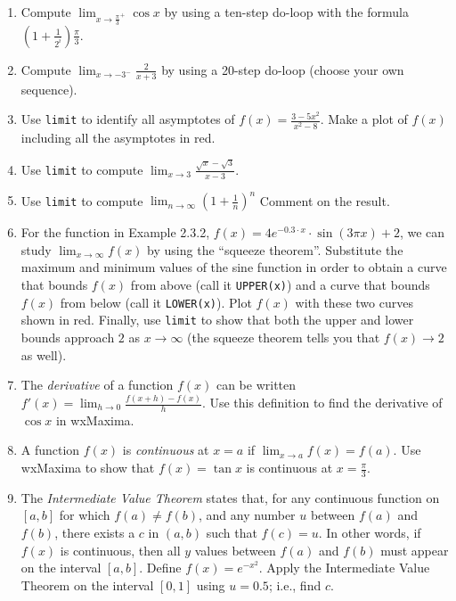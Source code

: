 \documentclass[10.5pt,twoside]{report}
\theoremstyle{definition}
\begin{document}
\begin{enumerate}

\item  Compute $\lim_{x \to {\frac{\pi}{3}}^+} \cos{x}$ by using a ten-step do-loop with the formula $(1+\frac{1}{2^i})\frac{\pi}{3}$.

\item Compute $\lim_{x \to -3^-}\frac{2}{x+3}$ by using a 20-step do-loop (choose your own sequence).

\item  Use \verb|limit| to identify all asymptotes of $f(x)=\frac{3-5x^2}{x^2-8}$.  Make a plot of $f(x)$ including all the asymptotes in red.

\item  Use \verb|limit| to compute $\lim_{x \to 3}\frac{\sqrt{x}-\sqrt{3}}{x-3}$.

\item  Use \verb|limit| to compute $\lim_{n \to \infty}(1+\frac{1}{n})^n$  Comment on the result.

\item  For the function in Example 2.3.2, $f(x)=4e^{-0.3\cdot x}\cdot\sin{(3 \pi x)}+2$, we can study $\lim_{x \to \infty}f(x)$ by using the ``squeeze theorem''.  Substitute the maximum and minimum values of the sine function in order to obtain a curve that bounds $f(x)$ from above (call it \verb|UPPER(x)|) and a curve that bounds $f(x)$ from below  (call it \verb|LOWER(x)|).  Plot $f(x)$ with these two curves shown in red.  Finally, use \verb|limit| to show that both the upper and lower bounds approach $2$ as $x \to \infty$ (the squeeze theorem tells you that $f(x) \to 2$ as well).

\item  The \textit{derivative} of a function $f(x)$ can be written $f'(x)=\lim_{h \to 0} \frac{f(x+h)-f(x)}{h}$.  Use this definition to find the derivative of $\cos{x}$ in wxMaxima.

\item  A function $f(x)$ is \textit{continuous} at $x=a$ if $\lim_{x \to a}f(x)=f(a)$.  Use wxMaxima to show that $f(x)=\tan{x}$ is continuous at $x=\frac{\pi}{3}$.

\item The \textit{Intermediate Value Theorem} states that, for any continuous function on $[a,b]$ for which $f(a) \neq f(b)$, and any number $u$ between $f(a)$ and $f(b)$, there exists a $c$ in $(a,b)$ such that $f(c)=u$. In other words, if $f(x)$ is continuous, then all $y$ values between $f(a)$ and $f(b)$ must appear on the interval $[a,b]$. Define $f(x)=e^{-x^2}$.  Apply the Intermediate Value Theorem on the interval $[0,1]$ using $u=0.5$; i.e., find $c$.


\end{enumerate}
\end{document}

